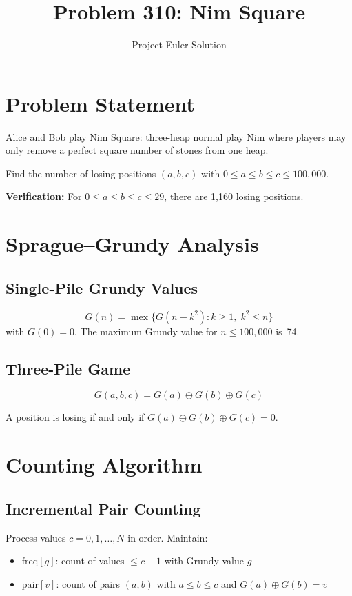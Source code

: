\documentclass[12pt]{article}
\title{Problem 310: Nim Square}
\author{Project Euler Solution}
\date{}
\theoremstyle{definition}
\begin{document}
\maketitle

\section{Problem Statement}
Alice and Bob play Nim Square: three-heap normal play Nim where players may only remove a perfect square number of stones from one heap.

Find the number of losing positions $(a,b,c)$ with $0 \leq a \leq b \leq c \leq 100{,}000$.

\textbf{Verification:} For $0 \leq a \leq b \leq c \leq 29$, there are 1{,}160 losing positions.

\section{Sprague--Grundy Analysis}

\subsection{Single-Pile Grundy Values}
\begin{equation}
    G(n) = \operatorname{mex}\{G(n - k^2) : k \geq 1,\; k^2 \leq n\}
\end{equation}
with $G(0) = 0$. The maximum Grundy value for $n \leq 100{,}000$ is~74.

\subsection{Three-Pile Game}
\begin{equation}
    G(a, b, c) = G(a) \oplus G(b) \oplus G(c)
\end{equation}

A position is losing if and only if $G(a) \oplus G(b) \oplus G(c) = 0$.

\section{Counting Algorithm}

\subsection{Incremental Pair Counting}
Process values $c = 0, 1, \ldots, N$ in order. Maintain:
\begin{itemize}
    \item $\text{freq}[g]$: count of values $\leq c-1$ with Grundy value $g$
    \item $\text{pair}[v]$: count of pairs $(a,b)$ with $a \leq b \leq c$ and $G(a) \oplus G(b) = v$
\end{itemize}
\end{document}
